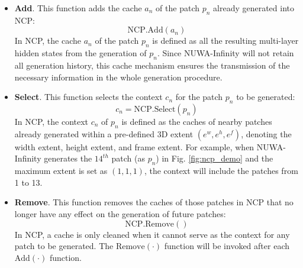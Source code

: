 \documentclass{article}
\begin{document}
\begin{itemize}[leftmargin=*]

\item \textbf{Add}. This function adds the cache $a_n$ of the patch $p_n$ already generated into NCP:
\begin{equation}\label{eq:ncpadd}
\text{NCP.Add}(a_n)
\end{equation}
In NCP, the cache $a_n$ of the patch $p_n$ is defined as all the resulting multi-layer hidden states from the generation of $p_n$. Since NUWA-Infinity will not retain all generation history, this cache mechanism ensures the transmission of the necessary information in the whole generation procedure.
\item \textbf{Select}. This function selects the context $c_n$ for the patch $p_n$ to be generated:%
\begin{equation}\label{eq:ncpselect}
c_n = \text{NCP.Select}(p_n)
\end{equation}
In NCP, the context $c_n$ of $p_n$ is defined as the caches of nearby patches already generated within a pre-defined 3D extent $(e^w, e^h, e^f)$, denoting the width extent, height extent, and frame extent. For example, when NUWA-Infinity generates the $14^{th}$ patch (as $p_n$) in Fig. \ref{fig:ncp_demo} and the maximum extent is set as $(1, 1, 1)$, the context will include the patches from 1 to 13.



\item \textbf{Remove}. This function removes the caches of those patches in NCP that no longer have any effect on the generation of future patches:
\begin{equation}\label{eq:ncpremove}
\text{NCP.Remove}()
\end{equation}
In NCP, a cache is only cleaned when it cannot serve as the context for any patch to be generated. The $\text{Remove}(\cdot)$ function will be invoked after each $\text{Add}(\cdot)$ function.

\end{itemize}
\end{document}
